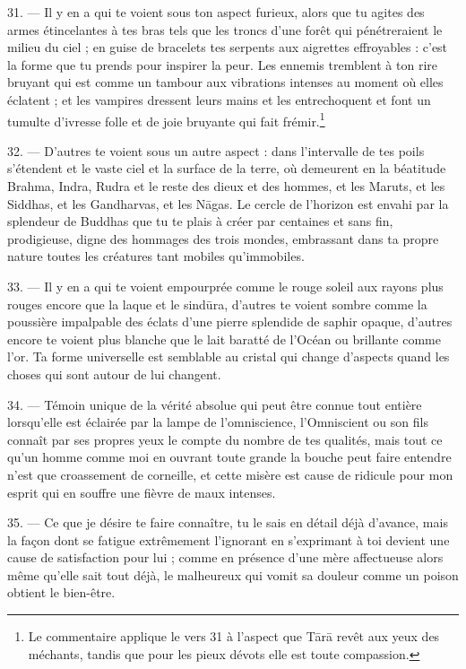 \documentclass[a4paper, 11pt, oneside, french]{article}
\begin{document}
31. --- Il y en a qui te voient sous ton aspect furieux, alors que tu agites des armes étincelantes à tes bras tels que les troncs d'une forêt qui pénétreraient le milieu du ciel ; en guise de bracelets tes serpents aux aigrettes effroyables : c'est la forme que tu prends pour inspirer la peur. Les ennemis tremblent à ton rire bruyant qui est comme un tambour aux vibrations intenses au moment où elles éclatent ; et les vampires dressent leurs mains et les entrechoquent et font un tumulte d'ivresse folle et de joie bruyante qui fait frémir.\footnote{Le commentaire applique le vers 31 à l'aspect que T\={a}r\={a} revêt aux yeux des méchants, tandis que pour les pieux dévots elle est toute compassion.}

32. --- D'autres te voient sous un autre aspect : dans l'intervalle de tes poils s'étendent et le vaste ciel et la surface de la terre, où demeurent en la béatitude Brahma, Indra, Rudra et le reste des dieux et des hommes, et les Maruts, et les Siddhas, et les Gandharvas, et les N\={a}gas. Le cercle de l'horizon est envahi par la splendeur de Buddhas que tu te plais à créer par centaines et sans fin, prodigieuse, digne des hommages des trois mondes, embrassant dans ta propre nature toutes les créatures tant mobiles qu'immobiles.

33. --- Il y en a qui te voient empourprée comme le rouge soleil aux rayons plus rouges encore que la laque et le sind\={u}ra, d'autres te voient sombre comme la poussière impalpable des éclats d'une pierre splendide de saphir opaque, d'autres encore te voient plus blanche que le lait baratté de l'Océan ou brillante comme l'or. Ta forme universelle est semblable au cristal qui change d'aspects quand les choses qui sont autour de lui changent.

34. --- Témoin unique de la vérité absolue qui peut être connue tout entière lorsqu'elle est éclairée par la lampe de l'omniscience, l'Omniscient ou son fils connaît par ses propres yeux le compte du nombre de tes qualités, mais tout ce qu'un homme comme moi en ouvrant toute grande la bouche peut faire entendre n'est que croassement de corneille, et cette misère est cause de ridicule pour mon esprit qui en souffre une fièvre de maux intenses.

35. --- Ce que je désire te faire connaître, tu le sais en détail déjà d'avance, mais la façon dont se fatigue extrêmement l'ignorant en s'exprimant à toi devient une cause de satisfaction pour lui ; comme en présence d'une mère affectueuse alors même qu'elle sait tout déjà, le malheureux qui vomit sa douleur comme un poison obtient le bien-être.
\end{document}
